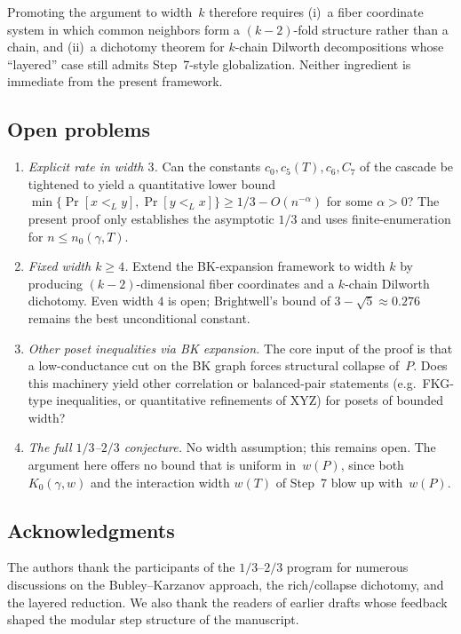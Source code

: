 \documentclass[11pt]{article}
\theoremstyle{definition}
\theoremstyle{remark}
\begin{document}
Promoting the argument to width~$k$ therefore requires (i)~a fiber
coordinate system in which common neighbors form a $(k-2)$-fold
structure rather than a chain, and (ii)~a dichotomy theorem for
$k$-chain Dilworth decompositions whose ``layered'' case still
admits Step~7-style globalization. Neither ingredient is immediate
from the present framework.

\subsection{Open problems}

\begin{enumerate}[nosep,label=(O\arabic*)]
 \item\label{O1} \emph{Explicit rate in width $3$.} Can the
  constants $c_0,c_5(T),c_6,C_7$ of the cascade be tightened to
  yield a quantitative lower bound $\min\{\Pr[x<_L y],\Pr[y<_L x]\}
  \ge 1/3 - O(n^{-\alpha})$ for some $\alpha>0$? The present proof
  only establishes the asymptotic $1/3$ and uses
  finite-enumeration for $n\le n_0(\gamma,T)$.
 \item\label{O2} \emph{Fixed width $k\ge 4$.} Extend the BK-expansion
  framework to width $k$ by producing $(k-2)$-dimensional fiber
  coordinates and a $k$-chain Dilworth dichotomy. Even width $4$ is
  open; Brightwell's bound of $3-\sqrt{5}\approx 0.276$ remains the
  best unconditional constant.
 \item\label{O3} \emph{Other poset inequalities via BK expansion.}
  The core input of the proof is that a low-conductance cut on the
  BK graph forces structural collapse of~$P$. Does this machinery
  yield other correlation or balanced-pair statements (e.g.\
  FKG-type inequalities, or quantitative refinements of XYZ)
  for posets of bounded width?
 \item\label{O4} \emph{The full $1/3$--$2/3$ conjecture.} No
  width assumption; this remains open. The argument here offers
  no bound that is uniform in~$w(P)$, since both
  $K_0(\gamma,w)$ and the interaction width $w(T)$ of Step~7
  blow up with~$w(P)$.
\end{enumerate}

\subsection*{Acknowledgments}

The authors thank the participants of the $1/3$--$2/3$ program for
numerous discussions on the Bubley--Karzanov approach, the
rich/collapse dichotomy, and the layered reduction. We also thank
the readers of earlier drafts whose feedback shaped the modular
step structure of the manuscript.
\end{document}
